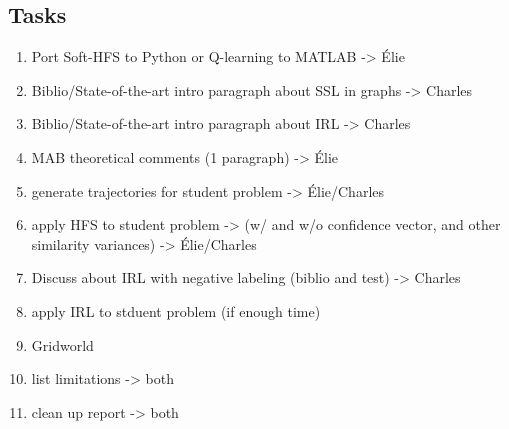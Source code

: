 \documentclass{article}
\begin{document}
\begin{appendices}
\section{Tasks}

\begin{enumerate}
    \item Port Soft-HFS to Python or Q-learning to MATLAB -> Élie
    \item Biblio/State-of-the-art intro paragraph about SSL in graphs -> Charles
    \item Biblio/State-of-the-art intro paragraph about IRL -> Charles
    \item MAB theoretical comments (1 paragraph) -> Élie
    \item generate trajectories for student problem -> Élie/Charles
    \item apply HFS to student problem -> (w/ and w/o confidence vector, and other similarity variances) -> Élie/Charles
    \item Discuss about IRL with negative labeling (biblio and test) -> Charles
    \item apply IRL to stduent problem (if enough time)
    \item Gridworld
    \item list limitations -> both
    \item clean up report -> both
\end{enumerate}


\end{appendices}
\end{document}
